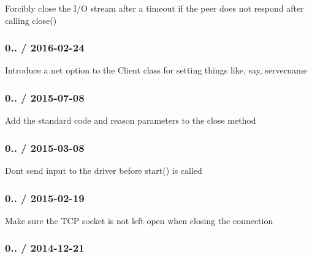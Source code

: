 
\begin{DoxyItemize}
\item Forcibly close the I/O stream after a timeout if the peer does not respond after calling {\ttfamily close()}
\end{DoxyItemize}

\subsubsection*{0.. / 2016-\/02-\/24}


\begin{DoxyItemize}
\item Introduce a {\ttfamily net} option to the {\ttfamily Client} class for setting things like, say, {\ttfamily servername}
\end{DoxyItemize}

\subsubsection*{0.. / 2015-\/07-\/08}


\begin{DoxyItemize}
\item Add the standard {\ttfamily code} and {\ttfamily reason} parameters to the {\ttfamily close} method
\end{DoxyItemize}

\subsubsection*{0.. / 2015-\/03-\/08}


\begin{DoxyItemize}
\item Don\textquotesingle{}t send input to the driver before {\ttfamily start()} is called
\end{DoxyItemize}

\subsubsection*{0.. / 2015-\/02-\/19}


\begin{DoxyItemize}
\item Make sure the T\+CP socket is not left open when closing the connection
\end{DoxyItemize}

\subsubsection*{0.. / 2014-\/12-\/21}


